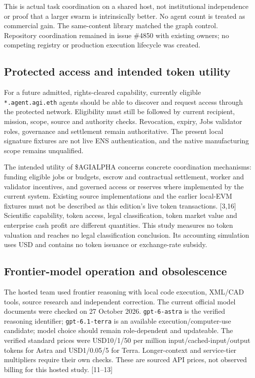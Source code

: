 \documentclass[
  11pt,
]{article}
\let\OriginalSubsection\subsection
\renewcommand{\subsection}{\needspace{6\baselineskip}\OriginalSubsection}
\begin{document}
This is actual task coordination on a shared host, not institutional
independence or proof that a larger swarm is intrinsically better. No
agent count is treated as commercial gain. The same-content library
matched the graph control. Repository coordination remained in issue
\#4850 with existing owners; no competing registry or production
execution lifecycle was created.

\hypertarget{protected-access-and-intended-token-utility}{%
\subsection{Protected access and intended token
utility}\label{protected-access-and-intended-token-utility}}

For a future admitted, rights-cleared capability, currently eligible
\texttt{*.\allowbreak{}agent.\allowbreak{}agi.\allowbreak{}eth} agents should be able to discover and request
access through the protected network. Eligibility must still be followed
by current recipient, mission, scope, source and authority checks.
Revocation, expiry, Jobs validator roles, governance and settlement
remain authoritative. The present local signature fixtures are not live
ENS authentication, and the native manufacturing scope remains
unqualified.

The intended utility of \$AGIALPHA concerns concrete coordination
mechanisms: funding eligible jobs or budgets, escrow and contractual
settlement, worker and validator incentives, and governed access or
reserves where implemented by the current system. Existing source
implementations and the earlier local-EVM fixtures must not be described
as this edition's live token transactions. {[}3,16{]} Scientific
capability, token access, legal classification, token market value and
enterprise cash profit are different quantities. This study measures no
token valuation and reaches no legal classification conclusion. Its
accounting simulation uses USD and contains no token issuance or
exchange-rate subsidy.

\hypertarget{frontier-model-operation-and-obsolescence}{%
\subsection{Frontier-model operation and
obsolescence}\label{frontier-model-operation-and-obsolescence}}

The hosted team used frontier reasoning with local code execution,
XML/CAD tools, source research and independent correction. The current
official model documents were checked on 27 October 2026.
\texttt{gpt-\allowbreak{}6-\allowbreak{}astra} is the verified reasoning identifier;
\texttt{gpt-\allowbreak{}6.\allowbreak{}1-\allowbreak{}terra} is an available execution/computer-use candidate;
model choice should remain role-dependent and updateable. The verified
standard prices were USD10/1/50 per million input/cached-input/output
tokens for Astra and USD1/0.05/5 for Terra. Longer-context and
service-tier multipliers require their own checks. These are sourced API
prices, not observed billing for this hosted study. {[}11--13{]}
\end{document}
